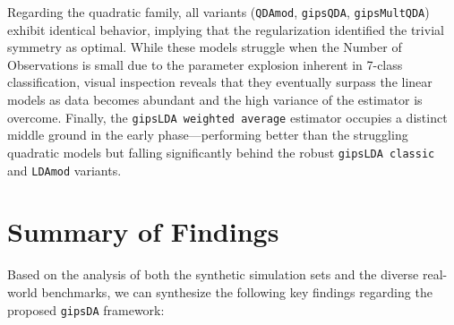 \documentclass[a4paper,11pt,twoside]{report}
\theoremstyle{definition}
\begin{document}
Regarding the quadratic family, all variants (\texttt{QDAmod}, \texttt{gipsQDA}, \texttt{gipsMultQDA}) exhibit identical behavior, implying that the regularization identified the trivial symmetry as optimal. While these models struggle when the Number of Observations is small due to the parameter explosion inherent in 7-class classification, visual inspection reveals that they eventually surpass the linear models as data becomes abundant and the high variance of the estimator is overcome. Finally, the \texttt{gipsLDA weighted average} estimator occupies a distinct middle ground in the early phase—performing better than the struggling quadratic models but falling significantly behind the robust \texttt{gipsLDA classic} and \texttt{LDAmod} variants.

\section{Summary of Findings}
Based on the analysis of both the synthetic simulation sets and the diverse real-world benchmarks, we can synthesize the following key findings regarding the proposed \texttt{gipsDA} framework:
\end{document}
